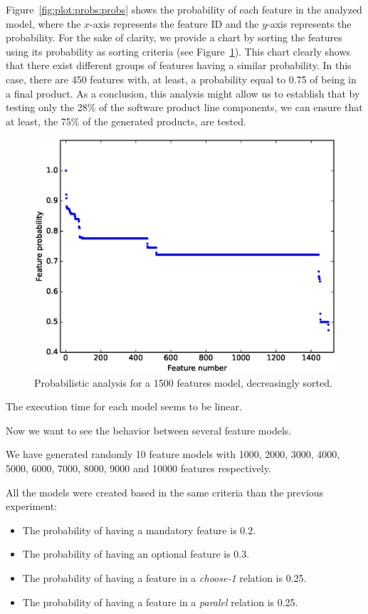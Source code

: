 Figure~\ref{fig:plot:probs:probs} shows the probability of each feature in the analyzed model, where the $x$-axis
represents the feature ID and the $y$-axis represents the probability. For the sake of clarity, we provide a chart by sorting the features using its probability as sorting criteria (see Figure~\ref{fig:plot:probs:probs:sorted}).
This chart clearly shows that there exist different groups of features having a similar probability.
%
In this case, there are 450 features with, at least, a probability equal to 0.75 of being in a final product. As a conclusion,
this analysis might allow us to establish that by testing only the 28\% of the software product line components, we can ensure that
at least, the 75\% of the generated products, are tested.

\begin{figure}[h]
        \centering
        \linefigure
        \includegraphics[width=0.8\hsize,angle=0]{plot_probs_probs_sorted.eps}
        \linefigure
        \caption{Probabilistic analysis for a 1500 features model, decreasingly sorted.}\label{fig:plot:probs:probs:sorted}
\end{figure}



The execution time for each model seems to be linear.

Now we want to see the behavior between several feature models.


We have generated randomly 10 feature models with 1000, 2000, 3000, 4000, 5000, 6000, 7000, 8000, 9000 and 10000 features respectively.

All the models were created based in the
same criteria than the previous experiment:


\begin{itemize}
	\item The probability of having a mandatory feature is 0.2.
	\item The probability of having an optional feature is 0.3.
	\item The probability of having a feature in a \emph{choose-1} relation is 0.25.
	\item The probability of having a feature in a \emph{paralel} relation is 0.25.
\end{itemize}

